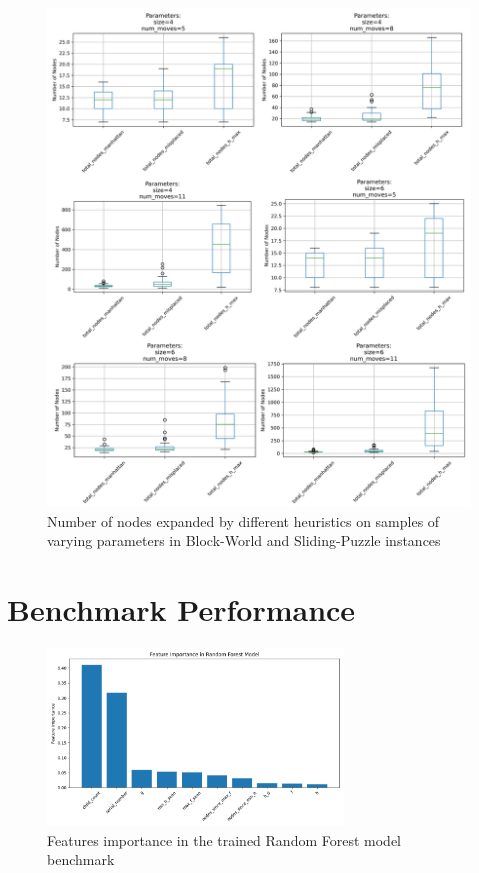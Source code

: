 \documentclass[letterpaper]{article}
\begin{document}
\begin{figure}[ht]
\begin{minipage}{0.39\textwidth}
        \includegraphics[width=\textwidth]{plots/sliding_puzzle_nodes_expanded.png}
    \end{minipage}
    \caption{Number of nodes expanded by different heuristics on samples of varying parameters in Block-World and Sliding-Puzzle instances}
    \label{fig:heuristic-expanded}
\end{figure}

\section{Benchmark Performance}

\begin{figure}[H]
    \centering
    \includegraphics[width=0.7\textwidth]{plots/feature_importance_rf.png}
    \caption{Features importance in the trained Random Forest model benchmark}
    \label{fig:rf_features}
\end{figure}
\end{document}
